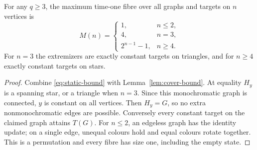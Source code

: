 \begin{theorem}\label{thm:maximum}
For any $q\ge3$, the maximum time-one fibre over all graphs and targets
on $n$ vertices is
\[
 M(n)=\begin{cases}1,&n\le2,\\4,&n=3,\\2^{n-1}-1,&n\ge4.\end{cases}
\]
For $n=3$ the extremizers are exactly constant targets on triangles, and
for $n\ge4$ exactly constant targets on stars.
\end{theorem}
\begin{proof}
Combine \eqref{eq:static-bound} with Lemma~\ref{lem:cover-bound}.
At equality $H_y$ is a spanning star, or a triangle when $n=3$.
Since this monochromatic graph is connected, $y$ is constant on all
vertices. Then $H_y=G$, so no extra nonmonochromatic edges are possible.
Conversely every constant target on the claimed graph attains $T(G)$.
For $n\le2$, an edgeless graph has the identity update; on a single edge,
unequal colours hold and equal colours rotate together. This is a
permutation and every fibre has size one, including the empty state.
\end{proof}
